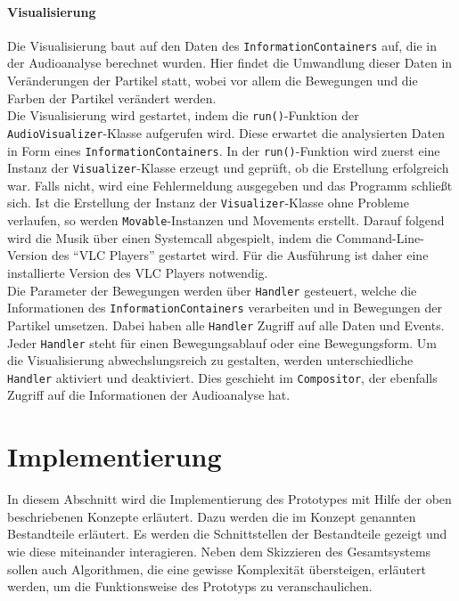 \documentclass[11pt,a4paper]{article}
\begin{document}
\paragraph{Visualisierung}
Die Visualisierung baut auf den Daten des \lstinline!InformationContainers! auf, die in der Audioanalyse berechnet wurden. Hier findet die Umwandlung dieser Daten in Veränderungen der Partikel statt, wobei vor allem die Bewegungen und die Farben der Partikel verändert werden.\\
Die Visualisierung wird gestartet, indem die \lstinline!run()!-Funktion der \lstinline!AudioVisualizer!-Klasse aufgerufen wird. Diese erwartet die analysierten Daten in Form eines \lstinline!InformationContainers!. In der \lstinline!run()!-Funktion wird zuerst eine Instanz der \lstinline!Visualizer!-Klasse erzeugt und geprüft, ob die Erstellung erfolgreich war. Falls nicht, wird eine Fehlermeldung ausgegeben und das Programm schließt sich. Ist die Erstellung der Instanz der \lstinline!Visualizer!-Klasse ohne Probleme verlaufen, so werden \lstinline!Movable!-Instanzen und Movements erstellt. Darauf folgend wird die Musik über einen Systemcall abgespielt, indem die Command-Line-Version des ``VLC Players'' gestartet wird. Für die Ausführung ist daher eine installierte Version des VLC Players notwendig.\\
Die Parameter der Bewegungen werden über \lstinline!Handler! gesteuert, welche die Informationen des \lstinline!InformationContainers! verarbeiten und in Bewegungen der Partikel umsetzen. Dabei haben alle \lstinline!Handler! Zugriff auf alle Daten und Events. Jeder \lstinline!Handler! steht für einen Bewegungsablauf oder eine Bewegungsform. Um die Visualisierung abwechslungsreich zu gestalten, werden unterschiedliche \lstinline!Handler! aktiviert und deaktiviert. Dies geschieht im \lstinline!Compositor!, der ebenfalls Zugriff auf die Informationen der Audioanalyse hat.

\newpage
\section{Implementierung}
In diesem Abschnitt wird die Implementierung des Prototypes mit Hilfe der oben beschriebenen Konzepte erläutert. Dazu werden die im Konzept genannten Bestandteile erläutert. Es werden die Schnittstellen der Bestandteile gezeigt und wie diese miteinander interagieren. Neben dem Skizzieren des Gesamtsystems sollen auch Algorithmen, die eine gewisse Komplexität übersteigen, erläutert werden, um die Funktionsweise des Prototyps zu veranschaulichen.
\end{document}
